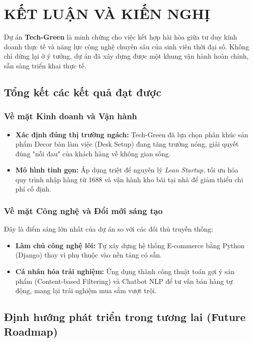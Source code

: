 \chapter{KẾT LUẬN VÀ KIẾN NGHỊ}
\label{ch:conclusion}

Dự án \textbf{Tech-Green} là minh chứng cho việc kết hợp hài hòa giữa tư duy kinh doanh thực tế và năng lực công nghệ chuyên sâu của sinh viên thời đại số. Không chỉ dừng lại ở ý tưởng, dự án đã xây dựng được một khung vận hành hoàn chỉnh, sẵn sàng triển khai thực tế.

\section{Tổng kết các kết quả đạt được}

\subsection{Về mặt Kinh doanh và Vận hành}
\begin{itemize}
    \item \textbf{Xác định đúng thị trường ngách:} Tech-Green đã lựa chọn phân khúc sản phẩm Decor bàn làm việc (Desk Setup) đang tăng trưởng nóng, giải quyết đúng "nỗi đau" của khách hàng về không gian sống.
    \item \textbf{Mô hình tinh gọn:} Áp dụng triệt để nguyên lý \textit{Lean Startup}, tối ưu hóa quy trình nhập hàng từ 1688 và vận hành kho bãi tại nhà để giảm thiểu chi phí cố định.
\end{itemize}

\subsection{Về mặt Công nghệ và Đổi mới sáng tạo}
Đây là điểm sáng lớn nhất của dự án so với các đối thủ truyền thống:
\begin{itemize}
    \item \textbf{Làm chủ công nghệ lõi:} Tự xây dựng hệ thống E-commerce bằng Python (Django) thay vì phụ thuộc vào nền tảng có sẵn.
    \item \textbf{Cá nhân hóa trải nghiệm:} Ứng dụng thành công thuật toán gợi ý sản phẩm (Content-based Filtering) và Chatbot NLP để tư vấn bán hàng tự động, mang lại trải nghiệm mua sắm vượt trội.
\end{itemize}

\section{Định hướng phát triển trong tương lai (Future Roadmap)}

